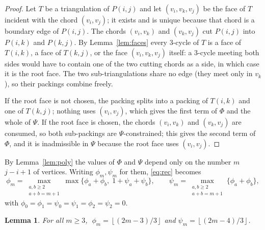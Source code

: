 \documentclass[11pt]{article}
\theoremstyle{plain}
\newtheorem{lemma}[theorem]{Lemma}
\theoremstyle{definition}
\theoremstyle{remark}
\newcommand{\Floor}[1]{\left\lfloor #1\right\rfloor}
\begin{document}
\begin{proof}
Let $T$ be a triangulation of $P(i,j)$ and let $(v_i,v_k,v_j)$ be the face of $T$ incident
with the chord $(v_i,v_j)$; it exists and is unique because that chord is a boundary edge
of $P(i,j)$.  The chords $(v_i,v_k)$ and $(v_k,v_j)$ cut $P(i,j)$ into $P(i,k)$ and
$P(k,j)$.  By Lemma~\ref{lem:faces} every $3$-cycle of $T$ is a face of $T(i,k)$, a face of
$T(k,j)$, or the face $(v_i,v_k,v_j)$ itself: a $3$-cycle meeting both sides would have to
contain one of the two cutting chords as a side, in which case it is the root face.  The
two sub-triangulations share no edge (they meet only in $v_k$), so their packings combine
freely.

If the root face is not chosen, the packing splits into a packing of $T(i,k)$ and one of
$T(k,j)$; nothing uses $(v_i,v_j)$, which gives the first term of $\Phi$ and the whole of
$\Psi$.  If the root face is chosen, the chords $(v_i,v_k)$ and $(v_k,v_j)$ are consumed,
so both sub-packings are $\Psi$-constrained; this gives the second term of $\Phi$, and it is
inadmissible in $\Psi$ because the root face uses $(v_i,v_j)$.
\end{proof}

By Lemma~\ref{lem:poly} the values of $\Phi$ and $\Psi$ depend only on the number $m$
$j-i+1$ of vertices.  Writing $\phi_m,\psi_m$ for them, \eqref{eq:rec} becomes
\begin{equation}\label{eq:rec2}
\phi_m=\max_{\substack{a,b\ge 2\\ a+b=m+1}}\max\{\phi_a+\phi_b,\;1+\psi_a+\psi_b\},
\qquad
\psi_m=\max_{\substack{a,b\ge 2\\ a+b=m+1}}\{\phi_a+\phi_b\},
\end{equation}
with $\phi_0=\phi_1=\psi_0=\psi_1=\phi_2=\psi_2=0$.

\begin{lemma}\label{lem:closed}
For all $m\ge 3$, $\;\phi_m=\Floor{(2m-3)/3}$ and $\psi_m=\Floor{(2m-4)/3}$.
\end{lemma}
\end{document}
